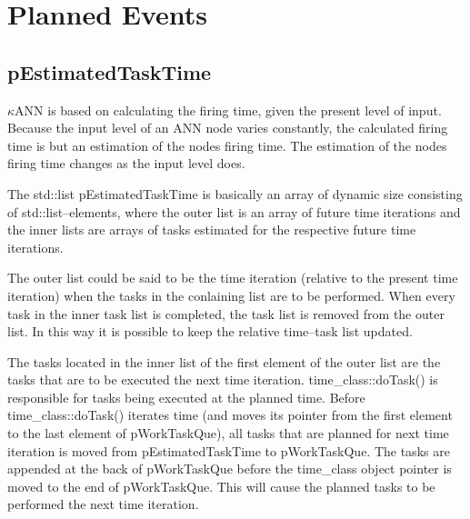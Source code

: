 	\section{Planned Events}
	\label{secPlannedEvents}
	\subsection{pEstimatedTaskTime}
	$\kappa$ANN is based on calculating the firing time, given the present level of input. 
	Because the input level of an ANN node varies constantly, the calculated firing time is but an estimation of the nodes firing time. 
	The estimation of the nodes firing time changes as the input level does.
	
	The std::list pEstimatedTaskTime is basically an array of dynamic size consisting of std::list--elements,
	where the outer list is an array of future time iterations and the inner lists are arrays of tasks estimated for the respective future time iterations.

	The outer list could be said to be the time iteration (relative to the present time iteration) when the tasks in the conlaining list are to be performed. 
	When every task in the inner task list is completed, %
		the task list is removed from the outer list. 
	In this way it is possible to keep the relative time--task list updated.

	The tasks located in the inner list of the first element of the outer list are the tasks that are to be executed the next time iteration.
	time\_class::doTask() is responsible for tasks being executed at the planned time. 
	Before time\_class::doTask() iterates time (and moves its pointer from the first element to the last element of pWorkTaskQue), all tasks that are planned for next time iteration is moved from pEstimatedTaskTime to pWorkTaskQue.
	The tasks are appended at the back of pWorkTaskQue before the time\_class object pointer is moved to the end of pWorkTaskQue. 
	This will cause the planned tasks to be performed the next time iteration.

